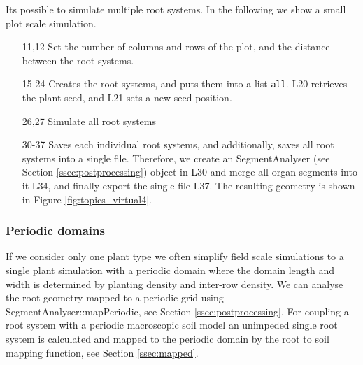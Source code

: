 Its possible to simulate multiple root systems. In the following we show a small plot scale simulation.



\begin{itemize}
\item[11,12] Set the number of columns and rows of the plot, and the distance between the root systems.
\item[15-24] Creates the root systems, and puts them into a list \texttt{all}. L20 retrieves the plant seed, and L21 sets a new seed position. 
\item[26,27] Simulate all root systems 
\item[30-37] Saves each individual root systems, and additionally, saves all root systems into a single file. 
Therefore, we create an SegmentAnalyser (see Section \ref{ssec:postprocessing}) object in L30 and merge all organ segments into it L34,  and finally export the single file L37. The resulting geometry is shown in Figure \ref{fig:topics_virtual4}.
\end{itemize}
% 


\subsubsection*{Periodic domains}

If we consider only one plant type we often simplify field scale simulations to a single plant simulation with a periodic domain where the domain length and width is determined by planting density and inter-row density. We can analyse the root geometry mapped to a periodic grid using SegmentAnalyser::mapPeriodic, see Section \ref{ssec:postprocessing}. For coupling a root system with a periodic macroscopic soil model an unimpeded single root system is calculated and mapped to the periodic domain by the root to soil mapping function, see Section \ref{ssec:mapped}.




